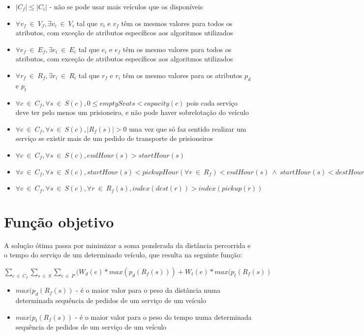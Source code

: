 \documentclass[article, a4paper, 12pt, oneside]{memoir}
\begin{document}
\begin{itemize}
	\item $\vert C_f \vert \leq \vert C_i \vert $ - não se pode usar mais veículos que os disponíveis
	\item $\forall v_f ~ \in ~ V_f, \exists v_i ~ \in ~ V_i$ tal que $v_i$ e $v_f$ têm os mesmos valores para todos os atributos, com exceção de atributos específicos aos algoritmos utilizados
	\item $\forall e_f ~ \in ~ E_f, \exists e_i ~ \in ~ E_i$ tal que $e_i$ e $e_f$ têm os mesmo valores para todos os atributos, com exceção de atributos específicos aos algoritmos utilizados
	\item $\forall r_f ~ \in ~ R_f, \exists r_i ~ \in ~ R_i$ tal que $r_f$ e $r_i$ têm os mesmo valores para os atributos $p_d$ e $p_t$
	\item $\forall c ~ \in ~ C_f, \forall s ~ \in ~ S(c), 0 \leq emptySeats < capacity(c)$ pois cada serviço deve ter pelo menos um prisioneiro, e não pode haver sobrelotação do veículo
	\item $\forall c ~ \in ~ C_f, \forall s ~ \in ~ S(c), \vert R_f(s) \vert > 0$ uma vez que só faz sentido realizar um serviço se existir mais de um pedido de transporte de prisioneiros
	\item $\forall c ~ \in ~ C_f, \forall s ~ \in ~ S(c), endHour(s) > startHour(s)$
	\item $\forall c ~ \in ~ C_f, \forall s ~ \in ~ S(c), startHour(s) < pickupHour(\forall r ~ \in ~ R_f) < endHour(s) ~ \wedge ~ startHour(s) < destHour(\forall r ~ \in ~ R_f) \leq endHour(s)$
	\item $\forall c ~ \in ~ C_f, \forall s ~ \in ~ S(c), \forall r ~ \in ~ R_f(s), index(dest(r)) > index(pickup(r))$
\end{itemize}

\section{Função objetivo}

A solução ótima passa por minimizar a soma ponderada da distância percorrida e o tempo do serviço de um determinado veículo, que resulta na seguinte função:

$\sum_{c ~ \in ~ C_f} \sum_{s ~ \in ~ S} \sum_{e ~ \in ~ P} (W_d(e) * max(p_d(R_f(s))) + W_t(e) * max(p_t(R_f(s))$

\begin{itemize}
	\item $max(p_d(R_f(s))$ - é o maior valor para o peso da distância numa determinada sequência de pedidos de um serviço de um veículo
	\item $max(p_t(R_f(s))$ - é o maior valor para o peso do tempo numa determinada sequência de pedidos de um serviço de um veículo
\end{itemize}
\end{document}
